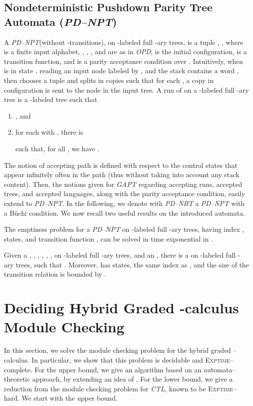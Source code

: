 \documentclass{LMCS}
\theoremstyle{plain}
\def \CTL           {\emph{CTL}\xspace}
\def \EXPTIME       {\textsc{Exptime}\xspace}
\def \OPD           {\emph{OPD}\xspace}
\def \PDNBT         {\emph{PD--NBT}\xspace}
\def \PDNPT         {\emph{PD--NPT}\xspace}
\def \TGAPT         {\emph{GAPT}\xspace}
\begin{document}
\subsection{Nondeterministic Pushdown Parity Tree Automata
(\PDNPT)}\label{sub:Pdnpt} A \PDNPT (without -transitions), on
-labeled full -ary trees, is a tuple , , where  is a finite input
alphabet, , , , and  are as in \OPD, 
is the initial configuration,  is a transition function, and  is a parity acceptance
condition over . Intuitively, when  is in state , reading an input
node  labeled by , and the stack contains a word , then  chooses a tuple
 and splits in
 copies such that for each , a copy in configuration  is sent to the node  in the input tree. A
run of  on a -labeled full -ary tree  is a -labeled tree  such that
\begin{enumerate}[]

  \item
  , and

  \item
  for each  with , there is
  
  such that, for all , we have .

\end{enumerate}
The notion of accepting path is defined with respect to the
control states that appear infinitely often in the path (thus
without taking into account any stack content). Then, the notions
given for \TGAPT regarding accepting runs, accepted trees, and
accepted languages, along with the parity acceptance condition,
easily extend to \PDNPT. In the following, we denote with \PDNBT a
\PDNPT with a B\"uchi condition. We now recall two useful results
on the introduced automata.
\begin{prop}\label{prop:EmptinessForPD-NBT}
The emptiness problem for a \PDNPT on -labeled full
-ary trees, having index ,  states, and transition
function , can be solved in time exponential in .
\end{prop}
\begin{prop}\label{pro:ClosureUnderIntersection}
Given a  , , , ,
, ,  on -labeled full -ary
trees, and an  ,
there is a   on -labeled full -ary trees,
such that . Moreover,  has
 states, the same index as , and the size of
the transition relation is bounded by .
\end{prop}


\section{Deciding Hybrid Graded -calculus Module Checking}\label{sec:DecidingHybridGradedModuleChecking}
In this section, we solve the module checking problem for the
hybrid graded --calculus. In particular, we show that this
problem is decidable and \EXPTIME--complete. For the upper bound,
we give an algorithm based on an automata--theoretic approach, by
extending an idea of \cite{KVW01}. For the lower bound, we give a
reduction from the module checking problem for \CTL, known to be
\EXPTIME--hard. We start with the upper bound.
\end{document}
